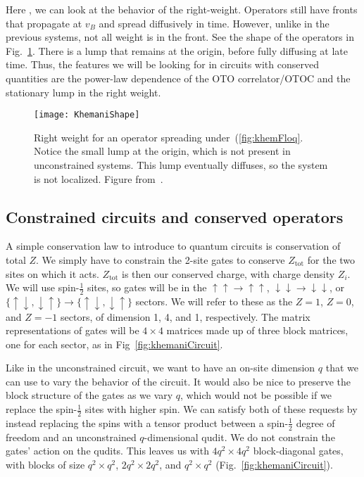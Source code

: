 \documentclass[a4paper,11pt]{article}
\renewcommand{\th}[1]{\frac{1}{#1}}
\newcommand{\tot}{\text{tot}}
\begin{document}
Here , we can look at the behavior of the right-weight. Operators still have fronts that propagate at $v_B$ and spread diffusively in time. However, unlike in the previous systems, not all weight is in the front. See the shape of the operators in Fig.~\ref{fig:KhemaniShape}. There is a lump that remains at the origin, before fully diffusing at late time.
Thus, the features we will be looking for in circuits with conserved quantities are the power-law dependence of the OTO correlator/OTOC and the stationary lump in the right weight.
\begin{figure}
	\centering
	\texttt{[image: KhemaniShape]}
	\caption{Right weight for an operator spreading under~(\ref{fig:khemFloq}. Notice the small lump at the origin, which is not present in unconstrained systems. This lump eventually diffuses, so the system is not localized. Figure from~\cite{KhemaniOpSp}. }
	\label{fig:KhemaniShape}
\end{figure}

\subsection{Constrained circuits and conserved operators} \label{sub:ccons}

A simple conservation law to introduce to quantum circuits is conservation of total $Z$. We simply have to constrain the 2-site gates to conserve $Z_\tot$ for the two sites on which it acts. $Z_\tot$ is then our conserved charge, with charge density $Z_i$.
We will use spin-$\th{2}$ sites, so gates will be in the $\uparrow\uparrow\to\uparrow\uparrow$, $\downarrow\downarrow\to\downarrow\downarrow$, or $\{\uparrow\downarrow,\downarrow\uparrow\}\to\{\uparrow\downarrow,\downarrow\uparrow\}$ sectors. We will refer to these as the $Z=1$, $Z=0$, and $Z=-1$ sectors, of dimension 1, 4, and 1, respectively. The matrix representations of gates will be $4\times4$ matrices made up of three block matrices, one for each sector, as in Fig~\ref{fig:khemaniCircuit}.

Like in the unconstrained circuit, we want to have an on-site dimension $q$ that we can use to vary the behavior of the circuit. It would also be nice to preserve the block structure of the gates as we vary $q$, which would not be possible if we replace the spin-$\th{2}$ sites with higher spin. We can satisfy both of these requests by instead replacing the spins with a tensor product between a spin-$\th{2}$ degree of freedom and an unconstrained $q$-dimensional qudit. We do not constrain the gates' action on the qudits.
This leaves us with $4q^2\times4q^2$ block-diagonal gates, with blocks of size $q^2\times q^2$, $2q^2\times 2q^2$, and $q^2\times q^2$ (Fig.~\ref{fig:khemaniCircuit}).
\end{document}
